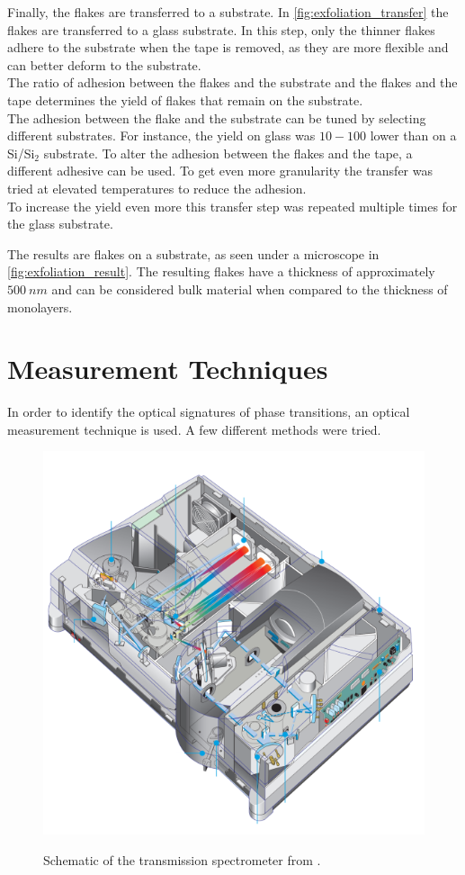 \documentclass[
	oneside,
	parskip=half,
	a4paper,
]{scrbook}
\begin{document}
Finally, the flakes are transferred to a substrate.
In \autoref{fig:exfoliation_transfer} the flakes are transferred to a glass substrate.
In this step, only the thinner flakes adhere to the substrate when the tape is removed, as they are more flexible and can better deform to the substrate.\\
The ratio of adhesion between the flakes and the substrate and the flakes and the tape determines the yield of flakes that remain on the substrate.\\
The adhesion between the flake and the substrate can be tuned by selecting different substrates.
For instance, the yield on glass was $10-100$ lower than on a Si/Si$_2$ substrate.
To alter the adhesion between the flakes and the tape, a different adhesive can be used. 
To get even more granularity the transfer was tried at elevated temperatures to reduce the adhesion.\\
To increase the yield even more this transfer step was repeated multiple times for the glass substrate.

The results are flakes on a substrate, as seen under a microscope in \autoref{fig:exfoliation_result}.
The resulting flakes have a thickness of approximately $\SI{500}{nm}$ and can be considered bulk material when compared to the thickness of monolayers.


\clearpage
\section{Measurement Techniques}
In order to identify the optical signatures of phase transitions, an optical measurement technique is used.
A few different methods were tried.

\begin{figure}
	\includegraphics[width=.4\textwidth]{../figures/carray schematic.png}\\
	\caption\\
	Schematic of the transmission spectrometer from \cite{cary}.
	\label{fig:carry}
\end{figure}
\end{document}
